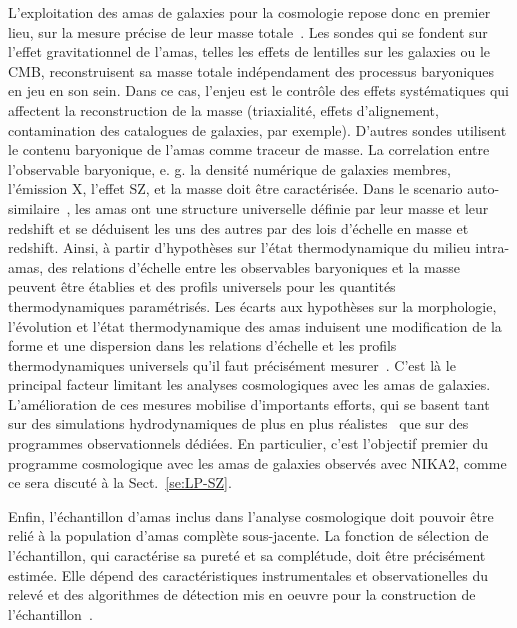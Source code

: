 L'exploitation des amas de galaxies pour la cosmologie repose donc en
premier lieu, sur la mesure précise de leur masse
totale~\citep[voir \emph{e.g.}][pour une revue récente sur la mesure
de la masse des amas]{Pratt2019}. Les sondes qui se fondent sur l'effet
gravitationnel de l'amas, telles les effets
de lentilles sur les galaxies ou le CMB, reconstruisent sa masse
totale indépendament des processus baryoniques en jeu en son
sein. Dans ce cas, l'enjeu est le contrôle des effets systématiques qui
affectent la reconstruction de la masse (triaxialité, effets
d'alignement, contamination des catalogues de galaxies, par
exemple). D'autres sondes utilisent le
contenu baryonique de l'amas comme traceur de masse. La correlation
entre l'observable baryonique, e. g. la densité numérique de galaxies
membres, l'émission X, l'effet SZ, et la masse doit être
caractérisée. Dans le scenario auto-similaire~\citep{Kaiser1986}, les
amas ont une structure universelle définie par leur masse et leur
redshift et se déduisent les uns des autres par des lois d'échelle en
masse et redshift. Ainsi, à partir d'hypothèses sur l'état
thermodynamique du milieu intra-amas, des relations d'échelle entre
les observables baryoniques et la masse peuvent être établies et des
profils universels pour les quantités thermodynamiques
paramétrisés. Les écarts aux hypothèses sur la morphologie,
l'évolution et l'état thermodynamique des amas induisent une
modification de la forme et une dispersion dans les relations
d'échelle et les profils thermodynamiques universels qu'il faut
précisément mesurer~\citep{NFW1996, Nagai2007, Arnaud2010}. C'est là le
principal facteur limitant les analyses cosmologiques avec les amas de
galaxies. L'amélioration de ces mesures mobilise d'importants efforts,
qui se basent tant sur des simulations hydrodynamiques de plus en plus
réalistes~\citep[comme exemple récent]{Henden2019} que sur des programmes
observationnels dédiées. 
En particulier, c'est l'objectif premier du programme cosmologique
avec les amas de galaxies observés avec NIKA2, comme ce sera discuté à
la Sect.~\ref{se:LP-SZ}.

Enfin, l'échantillon d'amas inclus dans l'analyse cosmologique doit
pouvoir être relié à la population d'amas complète sous-jacente. La
fonction de sélection de l'échantillon, qui caractérise sa pureté et
sa complétude, doit être précisément estimée. Elle dépend des
caractéristiques instrumentales et observationelles du relevé et des
algorithmes de détection mis en oeuvre pour la construction de
l'échantillon~\citep[par exemple]{Melin2005}. \\

